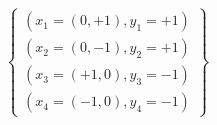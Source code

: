 $$
    \left\{
    \begin{array}{c}
        (x_1 =(0, +1), y_1=+1) \\
        (x_2 =(0, -1), y_2=+1) \\
        (x_3 =(+1, 0), y_3=-1) \\
        (x_4 =(-1, 0), y_4=-1)
    \end{array}
    \right\}
$$
